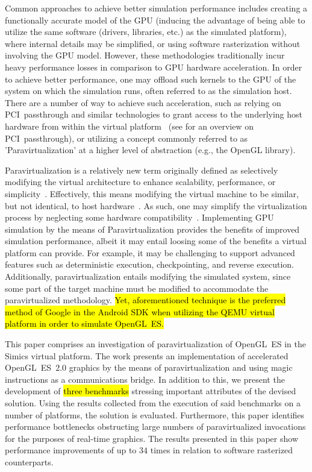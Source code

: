 Common approaches to achieve better simulation performance includes creating a functionally accurate model of the GPU (inducing the advantage of being able to utilize the same software (drivers, libraries, etc.) as the simulated platform), where internal details may be simplified, or using software rasterization without involving the GPU model.
However, these methodologies traditionally incur heavy performance losses in comparison to GPU hardware acceleration.
In order to achieve better performance, one may offload such kernels to the GPU of the system on which the simulation runs, often referred to as the simulation host.
There are a number of way to achieve such acceleration, such as relying on PCI~passthrough and similar technologies to grant access to the underlying host hardware from within the virtual platform~ (see  for an overview on PCI~passthrough), or utilizing a concept commonly referred to as 'Paravirtualization' at a higher level of abstraction (e.g., the OpenGL library).

Paravirtualization is a relatively new term originally defined as selectively modifying the virtual architecture to enhance scalability, performance, or simplicity~.
Effectively, this means modifying the virtual machine to be similar, but not identical, to host hardware~.
As such, one may simplify the virtualization process by neglecting some hardware compatibility~.
Implementing GPU simulation by the means of Paravirtualization provides the benefits of improved simulation performance, albeit it may entail loosing some of the benefits a virtual platform can provide.
For example, it may be challenging to support advanced features such as deterministic execution, checkpointing, and reverse execution.
Additionally, paravirtualization entails modifying the simulated system, since some part of the target machine must be modified to accommodate the paravirtualized methodology.
\hl{Yet, aforementioned technique is the preferred method of Google in the Android SDK when utilizing the QEMU virtual platform in order to simulate OpenGL~ES.}

This paper comprises an investigation of paravirtualization of OpenGL~ES in the Simics virtual platform.
The work presents an implementation of accelerated OpenGL~ES~$2.0$ graphics by the means of paravirtualization and using magic instructions as a communications bridge.
In addition to this, we present the development of \hl{three benchmarks} stressing important attributes of the devised solution.
Using the results collected from the execution of said benchmarks on a number of platforms, the solution is evaluated.
Furthermore, this paper identifies performance bottlenecks obstructing large numbers of paravirtualized invocations for the purposes of real-time graphics.
The results presented in this paper show performance improvements of up to $34$ times in relation to software rasterized counterparts.

